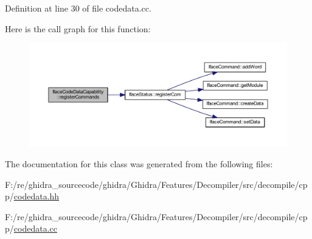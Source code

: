 Definition at line 30 of file codedata.\+cc.

Here is the call graph for this function\+:
\nopagebreak
\begin{figure}[H]
\begin{center}
\leavevmode
\includegraphics[width=350pt]{class_iface_code_data_capability_a04b5ffb87bb7f88afec65a0866076b33_cgraph}
\end{center}
\end{figure}


The documentation for this class was generated from the following files\+:\begin{DoxyCompactItemize}
\item 
F\+:/re/ghidra\+\_\+sourcecode/ghidra/\+Ghidra/\+Features/\+Decompiler/src/decompile/cpp/\mbox{\hyperlink{codedata_8hh}{codedata.\+hh}}\item 
F\+:/re/ghidra\+\_\+sourcecode/ghidra/\+Ghidra/\+Features/\+Decompiler/src/decompile/cpp/\mbox{\hyperlink{codedata_8cc}{codedata.\+cc}}\end{DoxyCompactItemize}
